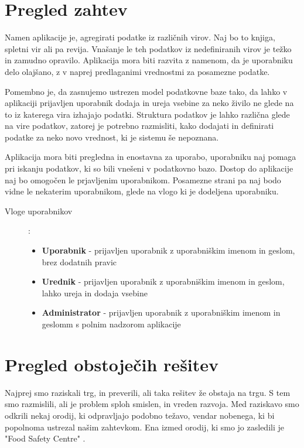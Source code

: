 \documentclass[a4paper, 12pt]{book}
\begin{document}
\section{Pregled zahtev}

Namen aplikacije je, agregirati podatke iz različnih virov. Naj bo to knjiga, spletni vir ali pa revija. Vnašanje le teh podatkov iz nedefiniranih virov je težko in zamudno opravilo. Aplikacija mora biti razvita z namenom, da je uporabniku delo olajšano, z v naprej predlaganimi vrednostmi za posamezne podatke. 

Pomembno je, da zasnujemo ustrezen model podatkovne baze tako, da lahko v aplikaciji prijavljen uporabnik dodaja in ureja vsebine za neko živilo ne glede na to iz katerega vira izhajajo podatki. 
Struktura podatkov je lahko različna glede na vire podatkov, zatorej je potrebno razmisliti, kako dodajati in definirati podatke za neko novo vrednost, ki je sistemu še nepoznana.

Aplikacija mora biti pregledna in enostavna za uporabo, uporabniku naj pomaga pri iskanju podatkov, ki so bili vnešeni v podatkovno bazo. Dostop do aplikacije naj bo omogočen le prjavljenim uporabnikom. Posamezne strani pa naj bodo vidne le nekaterim uporabnikom, glede na vlogo ki je dodeljena uporabniku.

\begin{description}
\item[Vloge uporabnikov]:
	\begin{itemize}
		\item \textbf{Uporabnik} - prijavljen uporabnik z uporabniškim imenom in geslom, brez dodatnih pravic
		\item \textbf{Urednik} - prijavljen uporabnik z uporabniškim imenom in geslom, lahko ureja in dodaja vsebine
		\item \textbf{Administrator} - prijavljen uporabnik z uporabniškim imenom in geslomm s polnim nadzorom aplikacije
	\end{itemize}
\end{description}

\section{Pregled obstoječih rešitev}

Najprej smo raziskali trg, in preverili, ali taka rešitev že obstaja na trgu. S tem smo razmislili, ali je problem sploh smislen, in vreden razvoja. Med raziskavo smo odkrili nekaj orodij, ki odpravljajo podobno težavo, vendar nobenega, ki bi popolnoma ustrezal našim zahtevkom. 
Ena izmed orodij, ki smo jo zasledili je "Food Safety Centre" \cite{food-safety-centre}.
\end{document}
